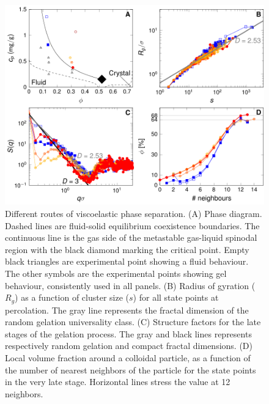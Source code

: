 \documentclass[12pt]{article}
\begin{document}
\begin{figure}[!t]
 \centering
 \includegraphics{phase_separation.pdf}
 \caption{Different routes of viscoelastic phase separation. 
(A) Phase diagram. Dashed lines are fluid-solid equilibrium coexistence boundaries. The continuous line is the gas side of the metastable gas-liquid spinodal region with the black diamond marking the critical point. Empty black triangles are experimental point showing a fluid behaviour. The other symbols are the experimental points showing gel behaviour, consistently used in all panels.
(B) Radius of gyration ($R_g$) as a function of cluster size ($s$) for all state points at percolation. The
 gray line represents the fractal dimension of the random gelation universality class.
(C) Structure factors for the late stages of the gelation process. The gray and black lines represents respectively random gelation and compact fractal dimensions.
(D) Local volume fraction around a colloidal particle, as a function of the number of nearest neighbors of the particle for the state points in the very late stage. Horizontal lines stress the value at 12 neighbors.
 }
 \label{fig:phase_separation}
\end{figure}

\clearpage
\end{document}
